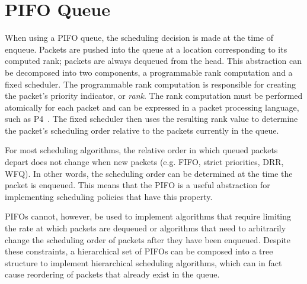 
\section{PIFO Queue}

When using a PIFO queue, the scheduling decision is made at the time of enqueue. Packets are pushed into the queue at a location corresponding to its computed rank; packets are always dequeued from the head. This abstraction can be decomposed into two components, a programmable rank computation and a fixed scheduler. The programmable rank computation is responsible for creating the packet's priority indicator, or {\em rank}. The rank computation must be performed atomically for each packet and can be expressed in a packet processing language, such as P4~\cite{p4:2014}. The fixed scheduler then uses the resulting rank value to determine the packet's scheduling order relative to the packets currently in the queue. %

For most scheduling algorithms, the relative order in which queued packets depart does not change when new packets (e.g. FIFO, strict priorities, DRR, WFQ). In other words, the scheduling order can be determined at the time the packet is enqueued. This means that the PIFO is a useful abstraction for implementing scheduling policies that have this property. 

PIFOs cannot, however, be used to implement algorithms that require limiting the rate at which packets are dequeued or algorithms that need to arbitrarily change the scheduling order of packets after they have been enqueued. Despite these constraints, a hierarchical set of PIFOs can be composed into a tree structure to implement hierarchical scheduling algorithms, which can in fact cause reordering of packets that already exist in the queue.
